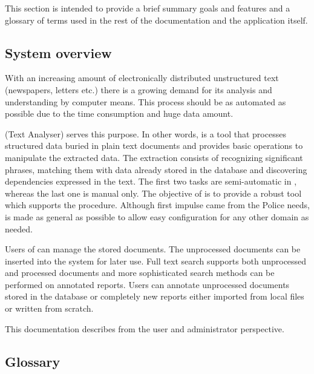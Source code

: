 

This section is intended to provide a brief summary \textan{} goals and features
and a glossary of terms used in the rest of the documentation and the application
itself.

\subsection{System overview}

With an increasing amount of electronically distributed unstructured text
(newspapers, letters etc.) there is a growing demand for its analysis and
understanding by computer means. This process should be as automated as possible
due to the time consumption and huge data amount.

\textan{} (Text Analyser) serves this purpose. In other words, \textan{} is a
tool that processes structured data buried in plain text documents and provides
basic operations to manipulate the extracted data. The extraction consists of
recognizing significant phrases, matching them with data already stored in the
database and discovering dependencies expressed in the text. The first two tasks
are semi-automatic in \textan{}, whereas the last one is manual only. The
objective of \textan{} is to provide a robust tool which supports the procedure.
Although first impulse came from the Police needs, \textan{} is made as general as
possible to allow easy configuration for any other domain as needed.

Users of \textan{} can manage the stored documents. The unprocessed documents can
be inserted into the system for later use. Full text search supports both
unprocessed and processed documents and more sophisticated search methods can be
performed on annotated reports. Users can annotate unprocessed documents stored in
the database or completely new reports either imported from local files or written
from scratch.

This documentation describes \textan{} from the user and administrator
perspective.

\subsection{Glossary}

